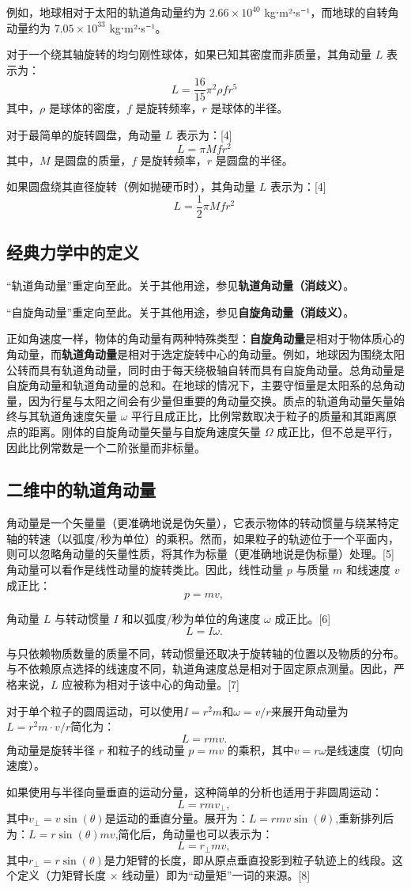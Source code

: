 例如，地球相对于太阳的轨道角动量约为 \( 2.66 \times 10^{40} \) kg⋅m²⋅s⁻¹，而地球的自转角动量约为 \( 7.05 \times 10^{33} \) kg⋅m²⋅s⁻¹。

对于一个绕其轴旋转的均匀刚性球体，如果已知其密度而非质量，其角动量 \( L \) 表示为：
\[
L = \frac{16}{15} \pi^2 \rho fr^5~
\]
其中，\( \rho \) 是球体的密度，\( f \) 是旋转频率，\( r \) 是球体的半径。

对于最简单的旋转圆盘，角动量 \( L \) 表示为：[4]
\[
L = \pi Mfr^2~
\]
其中，\( M \) 是圆盘的质量，\( f \) 是旋转频率，\( r \) 是圆盘的半径。

如果圆盘绕其直径旋转（例如抛硬币时），其角动量 \( L \) 表示为：[4]
\[
L = \frac{1}{2} \pi Mfr^2~
\]
\subsection{经典力学中的定义}   
“轨道角动量”重定向至此。关于其他用途，参见\textbf{轨道角动量（消歧义）}。  

“自旋角动量”重定向至此。关于其他用途，参见\textbf{自旋角动量（消歧义）}。

正如角速度一样，物体的角动量有两种特殊类型：\textbf{自旋角动量}是相对于物体质心的角动量，而\textbf{轨道角动量}是相对于选定旋转中心的角动量。例如，地球因为围绕太阳公转而具有轨道角动量，同时由于每天绕极轴自转而具有自旋角动量。总角动量是自旋角动量和轨道角动量的总和。在地球的情况下，主要守恒量是太阳系的总角动量，因为行星与太阳之间会有少量但重要的角动量交换。质点的轨道角动量矢量始终与其轨道角速度矢量 \( \omega \) 平行且成正比，比例常数取决于粒子的质量和其距离原点的距离。刚体的自旋角动量矢量与自旋角速度矢量 \( \Omega \) 成正比，但不总是平行，因此比例常数是一个二阶张量而非标量。
\subsection{二维中的轨道角动量}
角动量是一个矢量量（更准确地说是伪矢量），它表示物体的转动惯量与绕某特定轴的转速（以弧度/秒为单位）的乘积。然而，如果粒子的轨迹位于一个平面内，则可以忽略角动量的矢量性质，将其作为标量（更准确地说是伪标量）处理。[5] 角动量可以看作是线性动量的旋转类比。因此，线性动量 \( p \) 与质量 \( m \) 和线速度 \( v \) 成正比：
\[
p = mv,~
\]

角动量 \( L \) 与转动惯量 \( I \) 和以弧度/秒为单位的角速度 \( \omega \) 成正比。[6]
\[
L = I\omega.~
\]

与只依赖物质数量的质量不同，转动惯量还取决于旋转轴的位置以及物质的分布。与不依赖原点选择的线速度不同，轨道角速度总是相对于固定原点测量。因此，严格来说，\( L \) 应被称为相对于该中心的角动量。[7]

对于单个粒子的圆周运动，可以使用\(I = r^2 m\)和\(\omega = v/r\)来展开角动量为\(L = r^2 m \cdot v/r\)简化为：
\[
L = rmv.~
\]
角动量是旋转半径 \( r \) 和粒子的线动量 \( p = mv \) 的乘积，其中\(v = r\omega\)是线速度（切向速度）。

如果使用与半径向量垂直的运动分量，这种简单的分析也适用于非圆周运动：
\[
L = rmv_{\perp},~
\]
其中\(v_{\perp} = v\sin(\theta)\)是运动的垂直分量。展开为：\(L = rmv\sin(\theta)\),重新排列后为：\(L = r\sin(\theta) mv\),简化后，角动量也可以表示为：
\[
L = r_{\perp} mv,~
\]
其中\(r_{\perp} = r\sin(\theta)\)是力矩臂的长度，即从原点垂直投影到粒子轨迹上的线段。这个定义（力矩臂长度 × 线动量）即为“动量矩”一词的来源。[8]